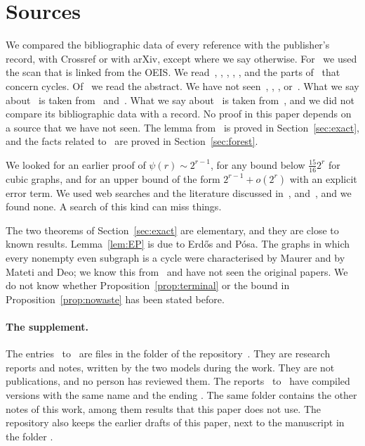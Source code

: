 \section{Sources}\label{app:sources}

We compared the bibliographic data of every reference with the publisher's record, with Crossref
or with arXiv, except where we say otherwise. For~\cite{ES} we used the scan that is linked from
the OEIS. We read~\cite{AACST}, \cite{ES}, \cite{Griffin}, \cite{KNT}, \cite{Markstrom}, and the
parts of~\cite{HK} that concern cycles. Of~\cite{AT} we read the abstract. We have not
seen~\cite{Bass}, \cite{Bondy}, \cite{EP}, \cite{Guichard} or~\cite{KS}. What we say
about~\cite{Bondy} is taken from~\cite{Bloom} and~\cite{KNT}. What we say about~\cite{Guichard} is
taken from~\cite{Markstrom}, and we did not compare its bibliographic data with a record. No proof
in this paper depends on a source that we have not seen. The lemma from~\cite{EP} is proved in
Section~\ref{sec:exact}, and the facts related to~\cite{Bass,KS} are proved in
Section~\ref{sec:forest}.

We looked for an earlier proof of $\psi(r)\sim2^{r-1}$, for any bound below $\frac{15}{16}2^{r}$
for cubic graphs, and for an upper bound of the form $2^{r-1}+o(2^{r})$ with an explicit error
term. We used web searches and the literature discussed in~\cite{AACST}, \cite{HK}
and~\cite{Markstrom}, and we found none. A search of this kind can miss things.

The two theorems of Section~\ref{sec:exact} are elementary, and they are close to known results.
Lemma~\ref{lem:EP} is due to Erd\H{o}s and P\'osa. The graphs in which every nonempty even subgraph
is a cycle were characterised by Maurer and by Mateti and Deo; we know this
from~\cite[Theorem~1]{ES} and have not seen the original papers. We do not know whether
Proposition~\ref{prop:terminal} or the bound in Proposition~\ref{prop:nowaste} has been stated
before.

\paragraph{The supplement.}
The entries~\cite{S0} to~\cite{S5} are files in the folder
 of the repository~\cite{Repo}. They are research
reports and notes, written by the two models during the work. They are not publications, and no
person has reviewed them. The reports~\cite{S0} to~\cite{S4} have compiled versions with the same
name and the ending . The same folder contains the other notes of this work, among them
results that this paper does not use. The repository also keeps the earlier drafts of this paper,
next to the manuscript in the folder .

